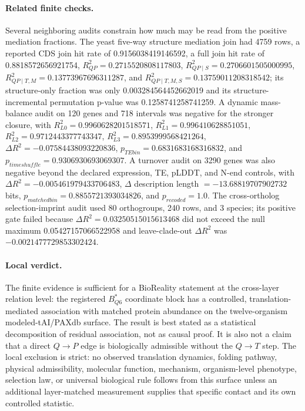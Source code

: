 \paragraph{Related finite checks.}
Several neighboring audits constrain how much may be read from the positive mediation fractions. The yeast five-way structure mediation join had 4759 rows, a reported CDS join hit rate of 0.9156038419146592, a full join hit rate of 0.8818572656921754, $R^2_{QP}=0.2715520808117803$, $R^2_{QP\mid S}=0.2706601505000995$, $R^2_{QP\mid T,M}=0.13773967696311287$, and $R^2_{QP\mid T,M,S}=0.13759011208318542$; its structure-only fraction was only 0.003284564452662019 and its structure-incremental permutation p-value was 0.1258741258741259. A dynamic mass-balance audit on 120 genes and 718 intervals was negative for the stronger closure, with $R^2_{L0}=0.9960628201518571$, $R^2_{L1}=0.996410628851051$, $R^2_{L2}=0.9712443377743347$, $R^2_{L3}=0.8953999568421264$, $\Delta R^2=-0.07584438093220836$, $p_{TEbin}=0.6831683168316832$, and $p_{timeshuffle}=0.9306930693069307$. A turnover audit on 3290 genes was also negative beyond the declared expression, TE, pLDDT, and N-end controls, with $\Delta R^2=-0.005461979433706483$, $\Delta$ description length $=-13.68819707902732$ bits, $p_{matchedbin}=0.8855721393034826$, and $p_{recoded}=1.0$. The cross-ortholog selection-imprint audit used 80 orthogroups, 240 rows, and 3 species; its positive gate failed because $\Delta R^2=0.03250515015613468$ did not exceed the null maximum 0.05427157066522958 and leave-clade-out $\Delta R^2$ was $-0.0021477729853302424$.

\paragraph{Local verdict.}
The finite evidence is sufficient for a BioReality statement at the cross-layer relation level: the registered $B^*_{Q6}$ coordinate block has a controlled, translation-mediated association with matched protein abundance on the twelve-organism modeled-tAI/PAXdb surface. The result is best stated as a statistical decomposition of residual association, not as causal proof. It is also not a claim that a direct $Q \to P$ edge is biologically admissible without the $Q \to T$ step. The local exclusion is strict: no observed translation dynamics, folding pathway, physical admissibility, molecular function, mechanism, organism-level phenotype, selection law, or universal biological rule follows from this surface unless an additional layer-matched measurement supplies that specific contact and its own controlled statistic.
